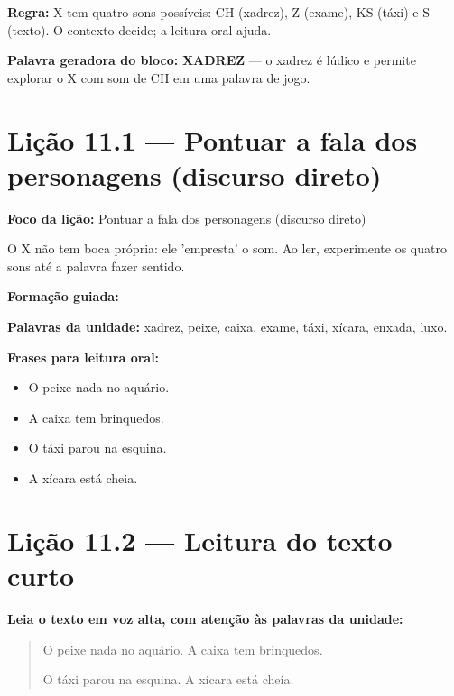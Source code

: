\textbf{Regra:} X tem quatro sons possíveis: CH (xadrez), Z (exame), KS (táxi) e S (texto). O contexto decide; a leitura oral ajuda.

\textbf{Palavra geradora do bloco:} \textbf{XADREZ} --- o xadrez é lúdico e permite explorar o X com som de CH em uma palavra de jogo.

\section{Lição 11.1 --- Pontuar a fala dos personagens (discurso direto)}

\textbf{Foco da lição:} Pontuar a fala dos personagens (discurso direto)


\begin{boquinha}
O X não tem boca própria: ele 'empresta' o som. Ao ler, experimente os quatro sons até a palavra fazer sentido.
\end{boquinha}

\noindent\textbf{Formação guiada:}

\begin{center}
\end{center}

\noindent\textbf{Palavras da unidade:} xadrez, peixe, caixa, exame, táxi, xícara, enxada, luxo.

\noindent\textbf{Frases para leitura oral:}
\begin{itemize}[leftmargin=1.6em]
  \item O peixe nada no aquário.
  \item A caixa tem brinquedos.
  \item O táxi parou na esquina.
  \item A xícara está cheia.
\end{itemize}

\section{Lição 11.2 --- Leitura do texto curto}

\noindent\textbf{Leia o texto em voz alta, com atenção às palavras da unidade:}


\begin{quote}
O peixe nada no aquário. A caixa tem brinquedos.

O táxi parou na esquina. A xícara está cheia.
\end{quote}

